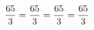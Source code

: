 \documentclass[preview]{standalone}
\begin{document}
\begin{align*}
\special{dvisvgm:raw <g id='unique000'>}\frac{65}{3} = \frac{65}{3} = \frac{65}{3} = \frac{65}{3}\special{dvisvgm:raw </g>}
\end{align*}
\end{document}
